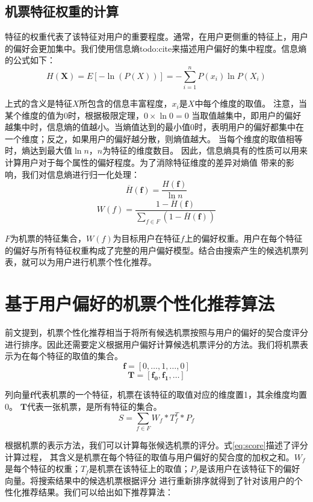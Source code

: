 \subsection{机票特征权重的计算}

特征的权重代表了该特征对用户的重要程度。通常，在用户更侧重的特征上，用户的偏好会更加集中。我们使用信息熵todo:cite来描述用户偏好的集中程度。信息熵的公式如下：
\begin{equation}
	H(\mathbf{X}) = E[-\ln (P(X))] = - \sum_{i=1}^n P(x_i)\ln P(X_i)
\end{equation}\par

上式的含义是特征$X$所包含的信息丰富程度，$x_i$是$X$中每个维度的取值。
注意，当某个维度的值为$0$时，根据极限定理，$0 \times \ln 0 = 0$
当取值越集中，即用户的偏好越集中时，信息熵的值越小。当熵值达到的最小值$0$时，表明用户的偏好都集中在一个维度；反之，如果用户的偏好越分散，则熵值越大。
当每个维度的取值相等时，熵达到最大值$\ln n$，$n$为特征的维度数目。
因此，信息熵具有的性质可以用来计算用户对于每个属性的偏好程度。为了消除特征维度的差异对熵值
带来的影响，我们对信息熵进行归一化处理：
\begin{equation}
  \overline{H}(\mathbf{f}) = \frac{H(\mathbf{f})}{\ln n}
\end{equation}
\begin{equation}
  W(f) = \frac{1 - \overline{H}(\mathbf{f})}{\sum_{f \in F}(1 - \overline{H}(\mathbf{f}))}
\end{equation}\par
$F$为机票的特征集合，$W(f)$为目标用户在特征$f$上的偏好权重。用户在每个特征的偏好与所有特征权重构成了完整的用户偏好模型。结合由搜索产生的候选机票列表，就可以为用户进行机票个性化推荐。

\section{基于用户偏好的机票个性化推荐算法}
\label{sec:base_rec}

前文提到，机票个性化推荐相当于将所有候选机票按照与用户的偏好的契合度评分进行排序。因此还需要定义根据用户偏好计算候选机票评分的方法。我们将机票表示为在每个特征的取值的集合。
\begin{equation}
  \mathbf{f} = [0,\dots,1,\dots,0]
\end{equation}
\begin{equation}
  \mathbf{T} = [\mathbf{f_0},\mathbf{f_1},\dots]
\end{equation}\par
列向量$\mathbf{f}$代表机票的一个特征，机票在该特征的取值对应的维度置1，其余维度均置0。 $\mathbf{T}$代表一张机票，是所有特征的集合。
\begin{equation}
	\label{eq:score}
	S = \sum_{f \in F}W_f*T_f^T*P_f
\end{equation}\par
根据机票的表示方法，我们可以计算每张候选机票的评分。式\ref{eq:score}描述了评分计算过程，
其含义是机票在每个特征的取值与用户偏好的契合度的加权之和。$W_f$是每个特征的权重；$T_f$是机票在该特征上的取值；$P_f$是该用户在该特征下的偏好向量。将搜索结果中的候选机票根据评分
进行重新排序就得到了针对该用户的个性化推荐结果。我们可以给出如下推荐算法：\par

